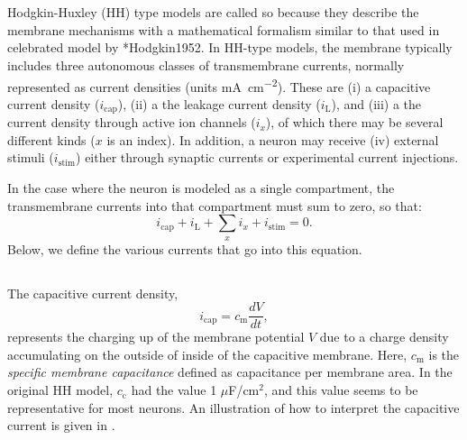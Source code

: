 \section{}
\label{sec:Neuron:membranecurrents}
Hodgkin-Huxley (HH) type models are called so because they describe the membrane mechanisms with a mathematical formalism similar to that used in celebrated model by \citeasnoun**{Hodgkin1952}. In HH-type models, the membrane typically includes three autonomous classes of transmembrane currents, normally represented as current densities (units \si{\milli\ampere\per\square\centi\metre}). These are (i) a capacitive current density ($i_{\mathrm{cap}}$), (ii) a the leakage current density ($i_{\mathrm{L}}$), and (iii) a the current density through active ion channels ($i_x$), of which there may be several different kinds ($x$ is an index). In addition, a neuron may receive (iv) external stimuli ($i_{\mathrm{stim}}$) either through synaptic currents or experimental current injections. 

In the case where the neuron is modeled as a single compartment, the transmembrane currents into that compartment must sum to zero, so that:
\begin{equation}
i_{\mathrm{cap}}+ i_{\mathrm{L}} + \sum_x{i_x} +  i_{\mathrm{stim}} = 0.
\label{eq:Neuron:singlecomp_zerosum}
\end{equation}
Below, we define the various currents that go into this equation.

\subsection{}
\label{sec:Neuron:Cap}
The capacitive current density,
\begin{equation}
i_{\mathrm{cap}}= c_{\mathrm{m}} \frac{dV}{dt},
\label{eq:Neuron:HHcap}
\end{equation}
represents the charging up of the membrane potential $V$ due to a charge density accumulating on the outside of inside of the capacitive membrane. Here, $c_{\mathrm{m}}$ is the \textit{specific membrane capacitance} defined as capacitance per membrane area. In the original HH model, $c_{\mathrm{c}}$ had the value 1 $\mu$F/cm$^2$, and this value seems to be representative for most neurons.  An illustration of how to interpret the capacitive current is given in . 

